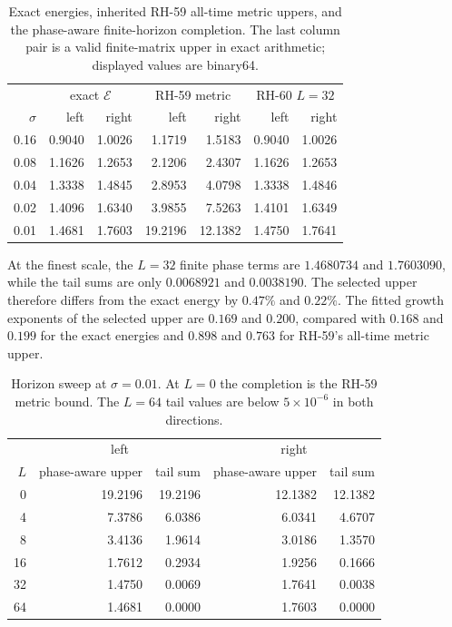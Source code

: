 \documentclass[11pt]{article}
\theoremstyle{remark}
\newcommand{\cE}{\mathcal E}
\begin{document}
\begin{table}[H]
\centering
\small
\begin{tabular}{@{}r|rr|rr|rr@{}}
\toprule
&\multicolumn{2}{c|}{exact $\cE$}
&\multicolumn{2}{c|}{RH-59 metric}
&\multicolumn{2}{c}{RH-60 $L=32$}\\
$\sigma$&left&right&left&right&left&right\\
\midrule
0.16&0.9040&1.0026&1.1719&1.5183&0.9040&1.0026\\
0.08&1.1626&1.2653&2.1206&2.4307&1.1626&1.2653\\
0.04&1.3338&1.4845&2.8953&4.0798&1.3338&1.4846\\
0.02&1.4096&1.6340&3.9855&7.5263&1.4101&1.6349\\
0.01&1.4681&1.7603&19.2196&12.1382&1.4750&1.7641\\
\bottomrule
\end{tabular}
\caption{Exact energies, inherited RH-59 all-time metric uppers, and the
phase-aware finite-horizon completion.  The last column pair is a valid
finite-matrix upper in exact arithmetic; displayed values are binary64.}
\label{tab:main}
\end{table}

At the finest scale, the $L=32$ finite phase terms are
$1.4680734$ and $1.7603090$, while the tail sums are only
$0.0068921$ and $0.0038190$.  The selected upper therefore differs from the
exact energy by $0.47\%$ and $0.22\%$.  The fitted growth exponents of the
selected upper are $0.169$ and $0.200$, compared with $0.168$ and $0.199$
for the exact energies and $0.898$ and $0.763$ for RH-59's all-time metric
upper.

\begin{table}[H]
\centering
\small
\begin{tabular}{@{}r|rr|rr@{}}
\toprule
&\multicolumn{2}{c|}{left}&\multicolumn{2}{c}{right}\\
$L$&phase-aware upper&tail sum&phase-aware upper&tail sum\\
\midrule
0&19.2196&19.2196&12.1382&12.1382\\
4&7.3786&6.0386&6.0341&4.6707\\
8&3.4136&1.9614&3.0186&1.3570\\
16&1.7612&0.2934&1.9256&0.1666\\
32&1.4750&0.0069&1.7641&0.0038\\
64&1.4681&0.0000&1.7603&0.0000\\
\bottomrule
\end{tabular}
\caption{Horizon sweep at $\sigma=0.01$.  At $L=0$ the completion is the
RH-59 metric bound.  The $L=64$ tail values are below $5\times10^{-6}$ in
both directions.}
\label{tab:horizon}
\end{table}
\end{document}
